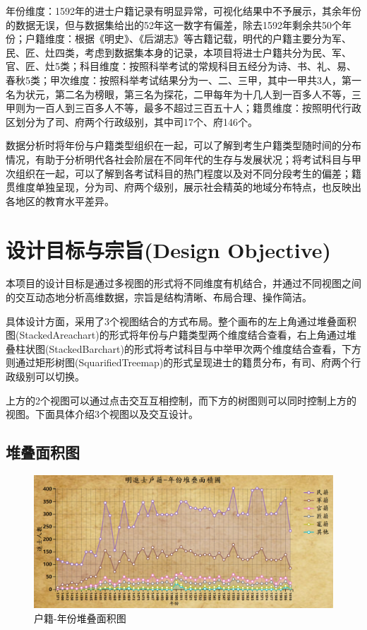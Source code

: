 \documentclass[11pt]{article}
\begin{document}
	年份维度：1592年的进士户籍记录有明显异常，可视化结果中不予展示，其余年份的数据无误，但与数据集给出的52年这一数字有偏差，除去1592年剩余共50个年份；户籍维度：根据《明史》、《后湖志》等古籍记载，明代的户籍主要分为军、民、匠、灶四类，考虑到数据集本身的记录，本项目将进士户籍共分为民、军、官、匠、灶5类；科目维度：按照科举考试的常规科目五经分为诗、书、礼、易、春秋5类；甲次维度：按照科举考试结果分为一、二、三甲，其中一甲共3人，第一名为状元，第二名为榜眼，第三名为探花，二甲每年为十几人到一百多人不等，三甲则为一百人到三百多人不等，最多不超过三百五十人；籍贯维度：按照明代行政区划分为了司、府两个行政级别，其中司17个、府146个。
	
	数据分析时将年份与户籍类型组织在一起，可以了解到考生户籍类型随时间的分布情况，有助于分析明代各社会阶层在不同年代的生存与发展状况；将考试科目与甲次组织在一起，可以了解到各考试科目的热门程度以及对不同分段考生的偏差；籍贯维度单独呈现，分为司、府两个级别，展示社会精英的地域分布特点，也反映出各地区的教育水平差异。
	
	\section{设计目标与宗旨(Design Objective)}
	本项目的设计目标是通过多视图的形式将不同维度有机结合，并通过不同视图之间的交互动态地分析高维数据，宗旨是结构清晰、布局合理、操作简洁。
	
	具体设计方面，采用了3个视图结合的方式布局。整个画布的左上角通过堆叠面积图(StackedAreachart)的形式将年份与户籍类型两个维度结合查看，右上角通过堆叠柱状图(StackedBarchart)的形式将考试科目与中举甲次两个维度结合查看，下方则通过矩形树图(SquarifiedTreemap)的形式呈现进士的籍贯分布，有司、府两个行政级别可以切换。
	
	上方的2个视图可以通过点击交互互相控制，而下方的树图则可以同时控制上方的视图。下面具体介绍3个视图以及交互设计。
	
	\subsection{堆叠面积图}
	\begin{figure}[H]
		\centering
		\includegraphics[width=12.5cm]{../Figure/StackedAreachart.png}
		\caption{户籍-年份堆叠面积图}
	\end{figure}
	
\end{document}
